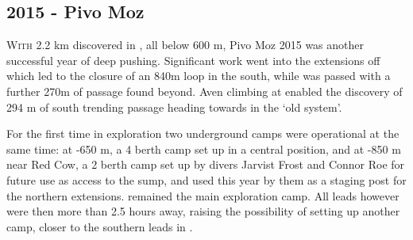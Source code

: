 \newpage
\begin{tcolorbox}
\chapter{2015 - Pivo Moz}
		\lettrine{W}{ith} 2.2 km discovered in , all below 600 m, Pivo Moz 2015 was another successful year of deep pushing. Significant work went into the extensions off  which led to the closure of an 840m loop in the south, while  was passed with a further 270m of passage found beyond. Aven climbing at  enabled the discovery of 294 m of south trending passage heading towards  in the ‘old system’. 

		For the first time in  exploration two underground camps were operational at the same time: at -650 m, a 4 berth camp set up in a central position, and  at -850 m near Red Cow, a 2 berth camp set up by divers Jarvist Frost and Connor Roe for future use as access to the  sump, and used this year by them as a staging post for the northern extensions.  remained the main exploration camp. All leads however were then more than 2.5 hours away, raising the possibility of setting up another camp, closer to the southern leads in .
	

\end{tcolorbox}
\BgThispage



